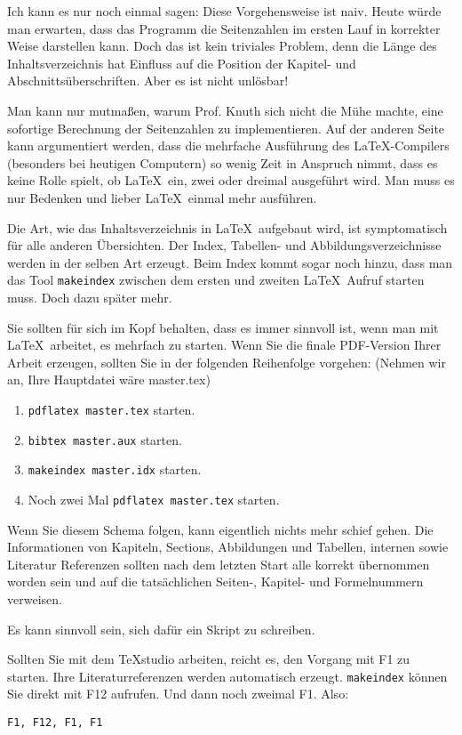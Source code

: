 Ich kann es nur noch einmal sagen: Diese Vorgehensweise ist naiv. Heute würde man erwarten, dass das Programm die Seitenzahlen im ersten Lauf in korrekter Weise darstellen kann. Doch das ist kein triviales Problem, denn die Länge des Inhaltsverzeichnis hat Einfluss auf die Position der Kapitel- und Abschnittsüberschriften. Aber es ist nicht unlösbar! 

Man kann nur mutmaßen, warum Prof. Knuth sich nicht die Mühe machte, eine sofortige Berechnung der Seitenzahlen zu implementieren. Auf der anderen Seite kann argumentiert werden, dass die mehrfache Ausführung des \LaTeX-Compilers (besonders bei heutigen Computern) so wenig Zeit in Anspruch nimmt, dass es keine Rolle spielt, ob \LaTeX\ ein, zwei oder dreimal ausgeführt wird. Man muss es nur Bedenken und lieber \LaTeX\ einmal mehr ausführen.

Die Art, wie das Inhaltsverzeichnis in \LaTeX\ aufgebaut wird, ist symptomatisch für alle anderen Übersichten. Der Index, Tabellen- und Abbildungsverzeichnisse werden in der selben Art erzeugt. Beim Index kommt sogar noch hinzu, dass man das Tool \texttt{makeindex} zwischen dem ersten und zweiten \LaTeX\ Aufruf starten muss. Doch dazu später mehr. 

Sie sollten für sich im Kopf behalten, dass es immer sinnvoll ist, wenn man mit \LaTeX\ arbeitet, es mehrfach zu starten. Wenn Sie die finale PDF-Version Ihrer Arbeit erzeugen, sollten Sie in der folgenden Reihenfolge vorgehen: (Nehmen wir an, Ihre Hauptdatei wäre master.tex)

\begin{enumerate}
\item \texttt{pdflatex master.tex} starten. 
\item \texttt{bibtex master.aux} starten.
\item \texttt{makeindex master.idx} starten.
\item Noch zwei Mal \texttt{pdflatex master.tex} starten. 
\end{enumerate}
Wenn Sie diesem Schema folgen, kann eigentlich nichts mehr schief gehen. Die Informationen von Kapiteln, Sections, Abbildungen und Tabellen, internen sowie Literatur Referenzen sollten nach dem letzten Start alle korrekt übernommen worden sein und auf die tatsächlichen Seiten-, Kapitel- und Formelnummern verweisen.

 Es kann sinnvoll sein, sich dafür ein Skript zu schreiben. 

Sollten Sie mit dem TeXstudio arbeiten, reicht es, den Vorgang mit F1 zu starten. Ihre Literaturreferenzen werden automatisch erzeugt. \texttt{makeindex} können Sie direkt mit F12 aufrufen. Und dann noch zweimal F1. Also:
\begin{verbatim}
F1, F12, F1, F1
\end{verbatim}

